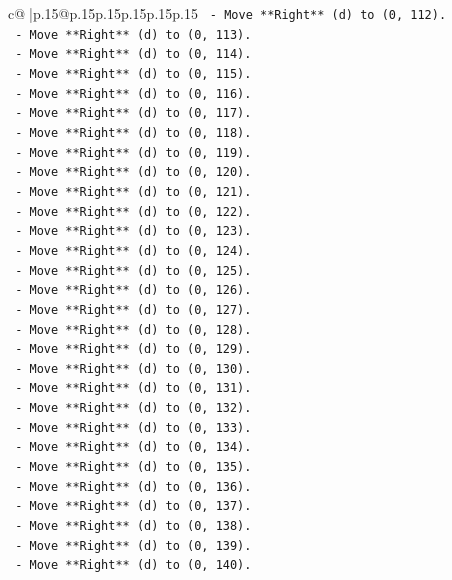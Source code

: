 \documentclass{article}
\begin{document}
{\begin{supertabular}{c@{$\;$}|p{.15\linewidth}@{}p{.15\linewidth}p{.15\linewidth}p{.15\linewidth}p{.15\linewidth}p{.15\linewidth}}
{{{\texttt{    {-} Move **Right** (d) to (0, 112).} \\
\texttt{    {-} Move **Right** (d) to (0, 113).} \\
\texttt{    {-} Move **Right** (d) to (0, 114).} \\
\texttt{    {-} Move **Right** (d) to (0, 115).} \\
\texttt{    {-} Move **Right** (d) to (0, 116).} \\
\texttt{    {-} Move **Right** (d) to (0, 117).} \\
\texttt{    {-} Move **Right** (d) to (0, 118).} \\
\texttt{    {-} Move **Right** (d) to (0, 119).} \\
\texttt{    {-} Move **Right** (d) to (0, 120).} \\
\texttt{    {-} Move **Right** (d) to (0, 121).} \\
\texttt{    {-} Move **Right** (d) to (0, 122).} \\
\texttt{    {-} Move **Right** (d) to (0, 123).} \\
\texttt{    {-} Move **Right** (d) to (0, 124).} \\
\texttt{    {-} Move **Right** (d) to (0, 125).} \\
\texttt{    {-} Move **Right** (d) to (0, 126).} \\
\texttt{    {-} Move **Right** (d) to (0, 127).} \\
\texttt{    {-} Move **Right** (d) to (0, 128).} \\
\texttt{    {-} Move **Right** (d) to (0, 129).} \\
\texttt{    {-} Move **Right** (d) to (0, 130).} \\
\texttt{    {-} Move **Right** (d) to (0, 131).} \\
\texttt{    {-} Move **Right** (d) to (0, 132).} \\
\texttt{    {-} Move **Right** (d) to (0, 133).} \\
\texttt{    {-} Move **Right** (d) to (0, 134).} \\
\texttt{    {-} Move **Right** (d) to (0, 135).} \\
\texttt{    {-} Move **Right** (d) to (0, 136).} \\
\texttt{    {-} Move **Right** (d) to (0, 137).} \\
\texttt{    {-} Move **Right** (d) to (0, 138).} \\
\texttt{    {-} Move **Right** (d) to (0, 139).} \\
\texttt{    {-} Move **Right** (d) to (0, 140).} \\
}}}
\end{supertabular}}
\end{document}
